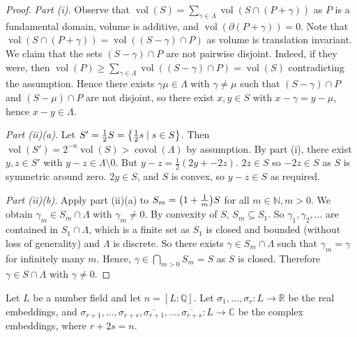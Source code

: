 \begin{proof}
    \emph{Part (i).}
    Observe that \( \operatorname{vol}(S) = \sum_{\gamma \in \Lambda} \operatorname{vol}(S \cap (P + \gamma)) \) as \( P \) is a fundamental domain, volume is additive, and \( \operatorname{vol}(\partial (P + \gamma)) = 0 \).
    Note that \( \operatorname{vol}(S \cap (P + \gamma)) = \operatorname{vol}((S - \gamma) \cap P) \) as volume is translation invariant.
    We claim that the sets \( (S - \gamma) \cap P \) are not pairwise disjoint.
    Indeed, if they were, then \( \operatorname{vol}(P) \geq \sum_{\gamma \in \Lambda} \operatorname{vol}((S - \gamma) \cap P) = \operatorname{vol}(S) \) contradicting the assumption.
    Hence there exists \( \gamma \mu \in \Lambda \) with \( \gamma \neq \mu \) such that \( (S - \gamma) \cap P \) and \( (S - \mu) \cap P \) are not disjoint, so there exist \( x, y \in S \) with \( x - \gamma = y - \mu \), hence \( x - y \in \Lambda \).

    \emph{Part (ii)(a).}
    Let \( S' = \frac{1}{2} S = \qty{\frac{1}{2} s \mid s \in S} \).
    Then \( \operatorname{vol}(S') = 2^{-n} \operatorname{vol}(S) > \operatorname{covol}(\Lambda) \) by assumption.
    By part (i), there exist \( y, z \in S' \) with \( y - z \in \Lambda \setminus \qty{0} \).
    But \( y - z = \frac{1}{2}(2y + -2z) \).
    \( 2z \in S \) so \( -2z \in S \) as \( S \) is symmetric around zero.
    \( 2y \in S \), and \( S \) is convex, so \( y - z \in S \) as required.

    \emph{Part (ii)(b).}
    Apply part (ii)(a) to \( S_m = \qty(1 + \frac{1}{m}) S \) for all \( m \in \mathbb N, m > 0 \).
    We obtain \( \gamma_m \in S_m \cap \Lambda \) with \( \gamma_m \neq 0 \).
    By convexity of \( S \), \( S_m \subseteq S_1 \).
    So \( \gamma_1, \gamma_2, \dots \) are contained in \( S_1 \cap \Lambda \), which is a finite set as \( S_1 \) is closed and bounded (without loss of generality) and \( \Lambda \) is discrete.
    So there exists \( \gamma \in S_m \cap \Lambda \) such that \( \gamma_m = \gamma \) for infinitely many \( m \).
    Hence, \( \gamma \in \bigcap_{m > 0} S_m = S \) as \( S \) is closed.
    Therefore \( \gamma \in S \cap \Lambda \) with \( \gamma \neq 0 \).
\end{proof}
Let \( L \) be a number field and let \( n = [L:\mathbb Q] \).
Let \( \sigma_1, \dots, \sigma_r \colon L \to \mathbb R \) be the real embeddings, and \( \sigma_{r+1}, \dots, \sigma_{r+s}, \overline{\sigma_{r+1}}, \dots, \overline{\sigma_{r+s}} \colon L \to \mathbb C \) be the complex embeddings, where \( r + 2s = n \).
